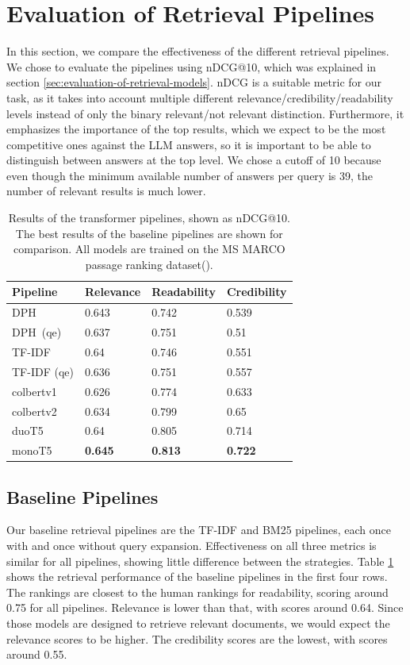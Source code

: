 \section{Evaluation of Retrieval Pipelines}
In this section, we compare the effectiveness of the different retrieval pipelines.
We chose to evaluate the pipelines using nDCG@10, which was explained in section \ref{sec:evaluation-of-retrieval-models}.
nDCG is a suitable metric for our task, as it takes into account multiple different relevance/credibility/readability levels instead of only the binary relevant/not relevant distinction.
Furthermore, it emphasizes the importance of the top results, which we expect to be the most competitive ones against the LLM answers, so it is important to be able to distinguish between answers at the top level.
We chose a cutoff of 10 because even though the minimum available number of answers per query is 39, the number of relevant results is much lower.
\begin{table}[tb]
\centering
\begin{tabularx}{\textwidth}{lXXX}
\hline
Pipeline    & Relevance          & Readability        & Credibility        \\ \hline
DPH         & 0.643 & 0.742 & 0.539 \\
DPH\ (qe)     & 0.637 & 0.751 & 0.51  \\
TF-IDF     & 0.64  & 0.746 & 0.551 \\
TF-IDF (qe) & 0.636 & 0.751 & 0.557 \\
colbertv1      & 0.626 & 0.774 & 0.633 \\
colbertv2       & 0.634 & 0.799 & 0.65  \\
duoT5            & 0.64  & 0.805 & 0.714 \\
monoT5           & \textbf{0.645} & \textbf{0.813} & \textbf{0.722} \\
\hline
\end{tabularx}
\caption{Results of the transformer pipelines, shown as nDCG@10. The best results of the baseline pipelines are shown for comparison. All models are trained on the MS MARCO passage ranking dataset(\cite{bajaj:2016:MSMARCO}).}
\label{tab:transformer_pipelines}
\end{table}
\subsection{Baseline Pipelines}
Our baseline retrieval pipelines are the TF-IDF and BM25 pipelines, each once with and once without query expansion.
Effectiveness on all three metrics is similar for all pipelines, showing little difference between the strategies.
Table \ref{tab:transformer_pipelines} shows the retrieval performance of the baseline pipelines in the first four rows.
The rankings are closest to the human rankings for readability, scoring around 0.75 for all pipelines.
Relevance is lower than that, with scores around 0.64.
Since those models are designed to retrieve relevant documents, we would expect the relevance scores to be higher.
The credibility scores are the lowest, with scores around 0.55.

